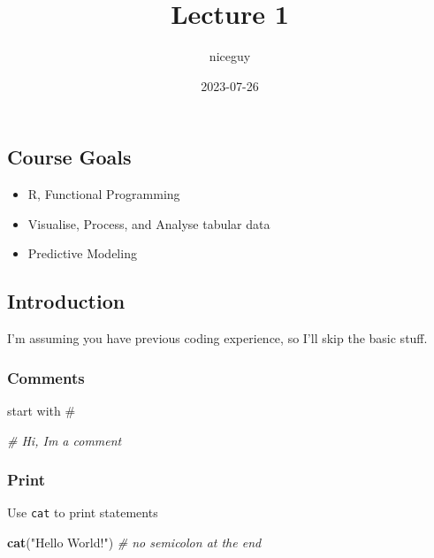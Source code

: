 \documentclass[
]{article}
\title{Lecture 1}
\author{niceguy}
\date{2023-07-26}
\newenvironment{Shaded}{\begin{snugshade}}{\end{snugshade}}
\newcommand{\CommentTok}[1]{\textcolor[rgb]{0.56,0.35,0.01}{\textit{#1}}}
\newcommand{\FunctionTok}[1]{\textcolor[rgb]{0.13,0.29,0.53}{\textbf{#1}}}
\newcommand{\NormalTok}[1]{#1}
\newcommand{\StringTok}[1]{\textcolor[rgb]{0.31,0.60,0.02}{#1}}
\providecommand{\tightlist}{%
  \setlength{\itemsep}{0pt}\setlength{\parskip}{0pt}}
\begin{document}
\maketitle

\hypertarget{course-goals}{%
\subsection{Course Goals}\label{course-goals}}

\begin{itemize}
\tightlist
\item
  R, Functional Programming
\item
  Visualise, Process, and Analyse tabular data
\item
  Predictive Modeling
\end{itemize}

\hypertarget{introduction}{%
\subsection{Introduction}\label{introduction}}

I'm assuming you have previous coding experience, so I'll skip the basic
stuff.

\hypertarget{comments}{%
\subsubsection{Comments}\label{comments}}

start with \#

\begin{Shaded}
\begin{Highlighting}[]
\CommentTok{\# Hi, I\textquotesingle{}m a comment}
\end{Highlighting}
\end{Shaded}

\hypertarget{print}{%
\subsubsection{Print}\label{print}}

Use \texttt{cat} to print statements

\begin{Shaded}
\begin{Highlighting}[]
\FunctionTok{cat}\NormalTok{(}\StringTok{"Hello World!"}\NormalTok{) }\CommentTok{\# no semicolon at the end}
\end{Highlighting}
\end{Shaded}
\end{document}
